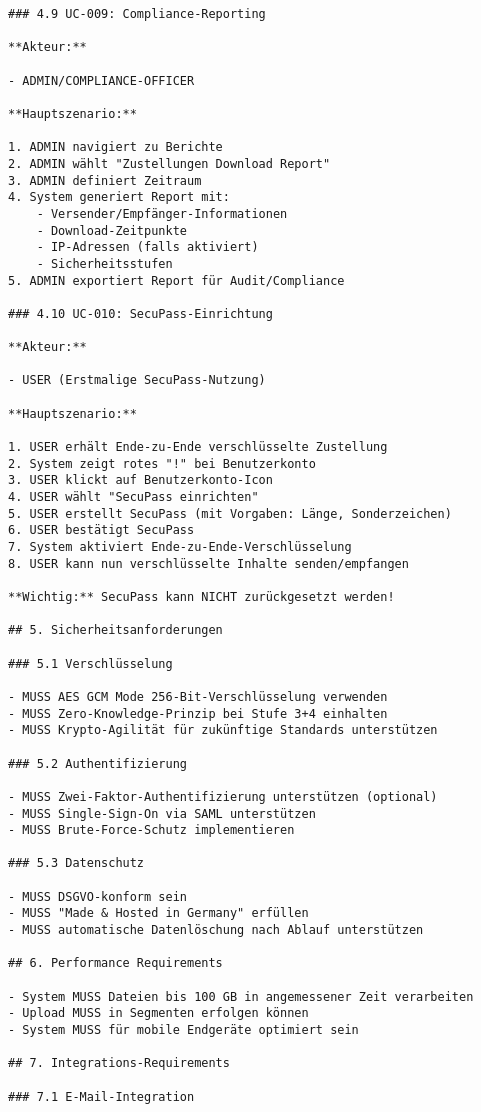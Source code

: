 \begin{Verbatim}[breaklines=true]
### 4.9 UC-009: Compliance-Reporting

**Akteur:**

- ADMIN/COMPLIANCE-OFFICER

**Hauptszenario:**

1. ADMIN navigiert zu Berichte
2. ADMIN wählt "Zustellungen Download Report"
3. ADMIN definiert Zeitraum
4. System generiert Report mit:
    - Versender/Empfänger-Informationen
    - Download-Zeitpunkte
    - IP-Adressen (falls aktiviert)
    - Sicherheitsstufen
5. ADMIN exportiert Report für Audit/Compliance

### 4.10 UC-010: SecuPass-Einrichtung

**Akteur:**

- USER (Erstmalige SecuPass-Nutzung)

**Hauptszenario:**

1. USER erhält Ende-zu-Ende verschlüsselte Zustellung
2. System zeigt rotes "!" bei Benutzerkonto
3. USER klickt auf Benutzerkonto-Icon
4. USER wählt "SecuPass einrichten"
5. USER erstellt SecuPass (mit Vorgaben: Länge, Sonderzeichen)
6. USER bestätigt SecuPass
7. System aktiviert Ende-zu-Ende-Verschlüsselung
8. USER kann nun verschlüsselte Inhalte senden/empfangen

**Wichtig:** SecuPass kann NICHT zurückgesetzt werden!

## 5. Sicherheitsanforderungen

### 5.1 Verschlüsselung

- MUSS AES GCM Mode 256-Bit-Verschlüsselung verwenden
- MUSS Zero-Knowledge-Prinzip bei Stufe 3+4 einhalten
- MUSS Krypto-Agilität für zukünftige Standards unterstützen

### 5.2 Authentifizierung

- MUSS Zwei-Faktor-Authentifizierung unterstützen (optional)
- MUSS Single-Sign-On via SAML unterstützen
- MUSS Brute-Force-Schutz implementieren

### 5.3 Datenschutz

- MUSS DSGVO-konform sein
- MUSS "Made & Hosted in Germany" erfüllen
- MUSS automatische Datenlöschung nach Ablauf unterstützen

## 6. Performance Requirements

- System MUSS Dateien bis 100 GB in angemessener Zeit verarbeiten
- Upload MUSS in Segmenten erfolgen können
- System MUSS für mobile Endgeräte optimiert sein

## 7. Integrations-Requirements

### 7.1 E-Mail-Integration


\end{Verbatim}
